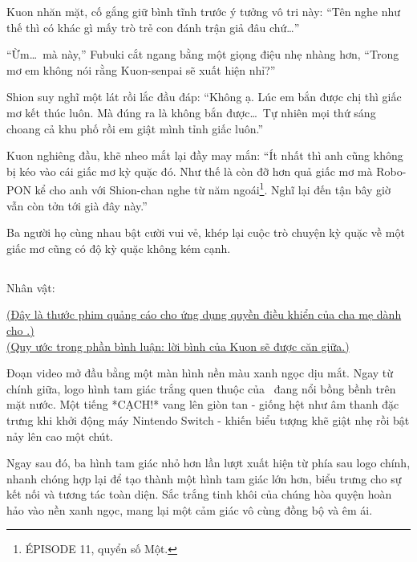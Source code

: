 \documentclass[../main.tex]{subfiles}
\begin{document}
Kuon nhăn mặt, cố gắng giữ bình tĩnh trước ý tưởng vô tri này: ``Tên nghe như thế thì có khác gì mấy trò trẻ con đánh trận giả đâu chứ\dots''

``Ừm\dots\ mà này,'' Fubuki cắt ngang bằng một giọng điệu nhẹ nhàng hơn, ``Trong mơ em không nói rằng Kuon-senpai sẽ xuất hiện nhỉ?''

Shion suy nghĩ một lát rồi lắc đầu đáp: ``Không ạ. Lúc em bắn được chị thì giấc mơ kết thúc luôn. Mà đúng ra là không bắn được\dots\ Tự nhiên mọi thứ sáng choang cả khu phố rồi em giật mình tỉnh giấc luôn.''

Kuon nghiêng đầu, khẽ nheo mắt lại đầy may mắn: ``Ít nhất thì anh cũng không bị kéo vào cái giấc mơ kỳ quặc đó. Như thế là còn đỡ hơn quả giấc mơ mà Robo-PON kể cho anh với Shion-chan nghe từ năm ngoái\footnote{{\flaregothic ÉPISODE 11}, quyển số Một.}. Nghĩ lại đến tận bây giờ vẫn còn tởn tới già đây này.''

Ba người họ cùng nhau bật cười vui vẻ, khép lại cuộc trò chuyện kỳ quặc về một giấc mơ cũng có độ kỳ quặc không kém cạnh.

\newpage

\subsection*{\label{ep-C2.IV}}
\begin{center}
  {\caviar\fontsize{12pt}{12pt}\selectfont Nhân vật:     }
\end{center}

\begin{center}
  \uline{(Đây là thước phim quảng cáo cho ứng dụng quyền điều khiển của cha mẹ dành cho \hll.)}\\
  \uline{(Quy ước trong phần bình luận: lời bình của Kuon sẽ được căn giữa.)}
\end{center}

Đoạn video mở đầu bằng một màn hình nền màu xanh ngọc dịu mắt. Ngay từ chính giữa, logo hình tam giác trắng quen thuộc của \hll\ đang nổi bồng bềnh trên mặt nước. Một tiếng *CẠCH!* vang lên giòn tan - giống hệt như âm thanh đặc trưng khi khởi động máy Nintendo Switch - khiến biểu tượng khẽ giật nhẹ rồi bật nảy lên cao một chút.

Ngay sau đó, ba hình tam giác nhỏ hơn lần lượt xuất hiện từ phía sau logo chính, nhanh chóng hợp lại để tạo thành một hình tam giác lớn hơn, biểu trưng cho sự kết nối và tương tác toàn diện. Sắc trắng tinh khôi của chúng hòa quyện hoàn hảo vào nền xanh ngọc, mang lại một cảm giác vô cùng đồng bộ và êm ái.
\end{document}
